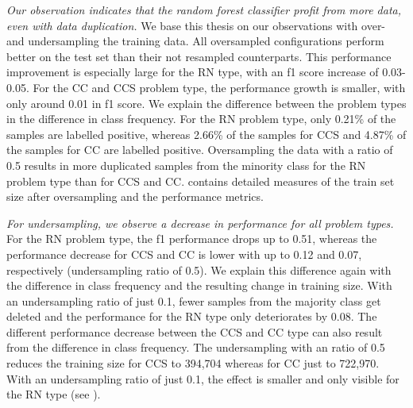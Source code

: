 \textit{Our observation indicates that the random forest classifier profit from more data, even with data duplication.} We base this thesis on our observations with over- and undersampling the training data. 
All oversampled configurations perform better on the test set than their not resampled counterparts. This performance improvement is especially large for the RN type, with an f1 score increase of 0.03-0.05. For the CC and CCS problem type, the performance growth is smaller, with only around 0.01 in f1 score. We explain the difference between the problem types in the difference in class frequency. For the RN problem type, only 0.21\% of the samples are labelled positive, whereas 2.66\% of the samples for CCS and 4.87\% of the samples for CC are labelled positive. Oversampling the data with a ratio of 0.5 results in more duplicated samples from the minority class for the RN problem type than for CCS and CC.  contains detailed measures of the train set size after oversampling and the performance metrics.

\textit{For undersampling, we observe a decrease in performance for all problem types.} For the RN problem type, the f1 performance drops up to 0.51, whereas the performance decrease for CCS and CC is lower with up to 0.12 and 0.07, respectively (undersampling ratio of 0.5). We explain this difference again with the difference in class frequency and the resulting change in training size. With an undersampling ratio of just 0.1, fewer samples from the majority class get deleted and the performance for the RN type only deteriorates by 0.08.
The different performance decrease between the CCS and CC type can also result from the difference in class frequency. The undersampling with an ratio of 0.5 reduces the training size for CCS to 394,704 whereas for CC just to 722,970. With an undersampling ratio of just 0.1, the effect is smaller and only visible for the RN type (see ).


